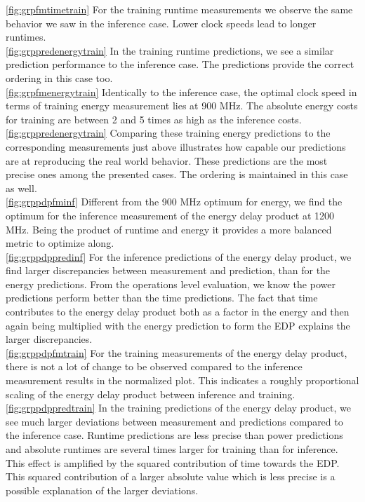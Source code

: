 \ref{fig:grpfmtimetrain} For the training runtime measurements we observe the same behavior we saw in the inference case. Lower clock speeds lead to longer runtimes.\\
\ref{fig:grppredenergytrain} In the training runtime predictions, we see a similar prediction performance to the inference case. The predictions provide the correct ordering in this case too.\\
\ref{fig:grpfmenergytrain} Identically to the inference case, the optimal clock speed in terms of training energy measurement lies at 900 MHz. The absolute energy costs for training are between 2 and 5 times as high as the inference costs. \\
\ref{fig:grppredenergytrain} Comparing these training energy predictions to the corresponding measurements just above illustrates how capable our predictions are at reproducing the real world behavior. These predictions are the most precise ones among the presented cases. The ordering is maintained in this case as well.\\
\ref{fig:grppdpfminf} Different from the 900 MHz optimum for energy, we find the optimum for the inference measurement of the energy delay product at 1200 MHz. Being the product of runtime and energy it provides a more balanced metric to optimize along. \\
\ref{fig:grppdppredinf} For the inference predictions of the energy delay product, we find larger discrepancies between measurement and prediction, than for the energy predictions. From the operations level evaluation, we know the power predictions perform better than the time predictions. The fact that time contributes to the energy delay product both as a factor in the energy and then again being multiplied with the energy prediction to form the EDP explains the larger discrepancies. \\
\ref{fig:grppdpfmtrain} For the training measurements of the energy delay product, there is not a lot of change to be observed compared to the inference measurement results in the normalized plot. This indicates a roughly proportional scaling of the energy delay product between inference and training. \\
\ref{fig:grppdppredtrain} In the training predictions of the energy delay product, we see much larger deviations between measurement and predictions compared to the inference case. Runtime predictions are less precise than power predictions and absolute runtimes are several times larger for training than for inference. This effect is amplified by the squared contribution of time towards the EDP. This squared contribution of a larger absolute value which is less precise is a possible explanation of the larger deviations.



